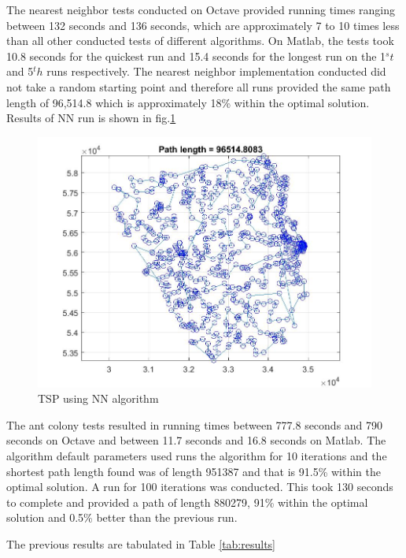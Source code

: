 \documentclass[twocolumn]{article}
\begin{document}
	The nearest neighbor tests conducted on Octave provided running times ranging between 132 seconds and 136 seconds, which are approximately 7 to 10 times less than all other conducted tests of different algorithms. On Matlab, the tests took 10.8 seconds for the quickest run and 15.4 seconds for the longest run on the 1$^st$ and 5$^th$ runs respectively. The nearest neighbor implementation conducted did not take a random starting point and therefore all runs provided the same path length of 96,514.8 which is approximately 18\%  within the optimal solution. Results of NN run is shown in fig.\ref{fig:NNalgorithm}
	
	\begin{figure}[h!]
		\centering
		\includegraphics[scale=0.25]{./NN.jpg}
		\caption{TSP using NN algorithm}
		\label{fig:NNalgorithm}
	\end{figure}
	
	The ant colony tests resulted in running times between 777.8 seconds and 790 seconds on Octave and between 11.7 seconds and 16.8 seconds on Matlab. The algorithm default parameters used runs the algorithm for 10 iterations and the shortest path length found was of length 951387 and that is 91.5\% within the optimal solution. A run for 100 iterations was conducted. This took 130 seconds to complete and provided a path of length 880279, 91\% within the optimal solution and 0.5\% better than the previous run.
	
	The previous results are tabulated in Table \ref{tab:results}
	
\end{document}
